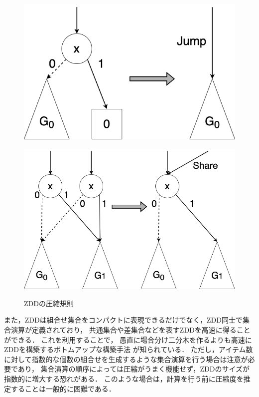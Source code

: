 \begin{figure}[htbp]
  \begin{minipage}[b]{0.48\hsize}
    \centering
    \includegraphics[scale=0.25]{img/delete_zdd.png}
    \label{delete_zdd}
  \end{minipage}
  \begin{minipage}[b]{0.48\hsize}
    \centering
    \includegraphics[scale=0.25]{img/share_zdd.png}
    \label{share_zdd}
  \end{minipage}
  \caption{ZDDの圧縮規則}\label{comp_rule}
\end{figure}

また，ZDDは組合せ集合をコンパクトに表現できるだけでなく，ZDD同士で集合演算が定義されており，
共通集合や差集合などを表すZDDを高速に得ることができる．
これを利用することで，
愚直に場合分け二分木を作るよりも高速にZDDを構築するボトムアップな構築手法\cite{minato}
が知られている．
ただし，アイテム数に対して指数的な個数の組合せを生成するような集合演算を行う場合は注意が必要であり，
集合演算の順序によっては圧縮がうまく機能せず，ZDDのサイズが指数的に増大する恐れがある．
このような場合は，計算を行う前に圧縮度を推定することは一般的に困難である．

